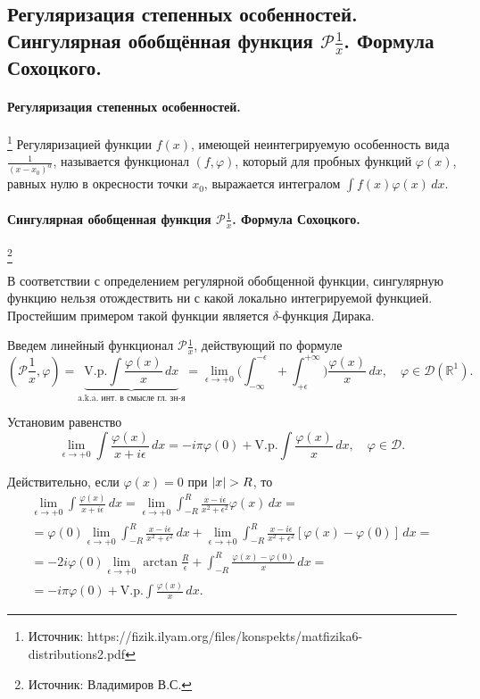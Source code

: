 \subsection{Регуляризация степенных особенностей. Сингулярная обобщённая функция $\mathcal{P} \frac{1}{x}$. Формула Сохоцкого.}

\paragraph{Регуляризация степенных особенностей.}\footnote{Источник: https://fizik.ilyam.org/files/konspekts/matfizika6-distributions2.pdf} Регуляризацией функции $f(x)$, имеющей неинтегрируемую особенность вида $\frac{1}{(x - x_0)^{\alpha}}$, называется функционал $(f, \varphi)$, который для пробных функций $\varphi(x)$, равных нулю в окресности точки $x_0$, выражается интегралом $\int f(x) \varphi(x) \, dx$.

\paragraph{Сингулярная обобщенная функция $\mathcal{P}{\frac{1}{x}}$. Формула Сохоцкого.} \footnote{Источник: Владимиров В.С.}

В соответствии с определением регулярной обобщенной функции, сингулярную функцию нельзя отождествить ни с какой локально интегрируемой функцией. Простейшим примером такой функции является $\delta$-функция Дирака.

Введем линейный функционал $\mathcal{P}{\frac{1}{x}}$, действующий по формуле
\begin{equation*}
	(\mathcal{P}{\frac{1}{x}}, \varphi) = \underbrace{\text{V.p.} \int \frac{\varphi(x)}{x} \, dx}_{\text{a.k.a. инт. в смысле гл. зн-я}} = 
	\lim \limits_{\epsilon \to +0} \Big(\int_{-\infty}^{-\epsilon} + \int_{+\epsilon}^{+\infty}\Big) \frac{\varphi(x)}{x} \, dx, \quad \varphi \in \mathcal{D}(\mathbb{R}^1).
\end{equation*} 

Установим равенство
\begin{equation}
	\label{huinya_s_potolka}
	\lim \limits_{\epsilon \to +0} \int \frac{\varphi(x)}{x + i \epsilon} \, dx = - i \pi \varphi(0) + \text{V.p.} \int \frac{\varphi(x)}{x} \, dx, \quad \varphi \in \mathcal{D}.
\end{equation}

Действительно, если $\varphi(x) = 0$ при $\abs{x} > R$, то 
\begin{align*}
	\lim \limits_{\epsilon \to +0} \int \frac{\varphi(x)}{x + i \epsilon} \, dx = \lim \limits_{\epsilon \to +0} \int_{-R}^{R} \frac{x - i \epsilon}{x^2 + \epsilon^2} \varphi(x) \, dx = \\
	= \varphi(0) \lim \limits_{\epsilon \to +0} \int_{-R}^{R} \frac{x - i \epsilon}{x^2 + \epsilon^2} \, dx + \lim \limits_{\epsilon \to +0} \int_{-R}^{R} \frac{x - i \epsilon}{x^2 + \epsilon^2} [\varphi(x) - \varphi(0)] \, dx = \\
	= - 2 i \varphi(0) \lim \limits_{\epsilon \to +0} \arctan{\frac{R}{\epsilon}} + \int_{-R}^{R} \frac{\varphi(x) - \varphi(0)}{x} \, dx = \\
	= - i \pi \varphi(0) + \text{V.p.} \int \frac{\varphi(x)}{x} \, dx.
\end{align*}

